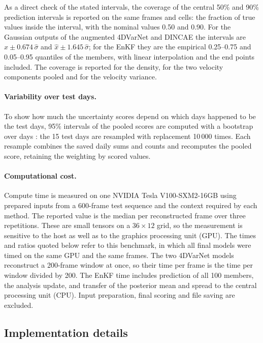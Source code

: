 \documentclass[english, 12pt, a4paper, elec, utf8, a-2b, online]{aaltothesis}
\begin{document}
As a direct check of the stated intervals, the coverage of the central 50\%
and 90\% prediction intervals is reported on the same frames and cells: the
fraction of true values inside the interval, with the nominal values 0.50 and
0.90. For the Gaussian outputs of the augmented 4DVarNet and DINCAE the
intervals are $\hat{x} \pm 0.674\,\hat{\sigma}$ and
$\hat{x} \pm 1.645\,\hat{\sigma}$; for the EnKF they are the empirical 0.25--0.75
and 0.05--0.95 quantiles of the members, with linear interpolation and the end
points included. The coverage is reported for the density, for the two
velocity components pooled and for the velocity variance.

\paragraph{Variability over test days.}
To show how much the uncertainty scores depend on which days happened to be the
test days, 95\% intervals of the pooled scores are computed with a bootstrap over days \cite{efron1979bootstrap}:
the 15 test days are resampled with replacement 10\,000 times.
Each resample combines the saved daily sums and counts and recomputes the
pooled score, retaining the weighting by scored values.

\paragraph{Computational cost.}
Compute time is measured on one NVIDIA Tesla V100-SXM2-16GB using prepared
inputs from a 600-frame test sequence and the context required by each method.
The reported value is the median per reconstructed frame over three repetitions.
These are small tensors on a $36 \times 12$ grid, so the measurement is
sensitive to the host as well as to the graphics processing unit (GPU). The times and ratios quoted below
refer to this benchmark, in which all final models were timed on the same GPU
and the same frames.
The two 4DVarNet models reconstruct a 200-frame window at once, so their time per
frame is the time per window divided by 200. The EnKF time includes prediction of all 100
members, the analysis update, and transfer of the posterior mean and spread
to the central processing unit (CPU). Input preparation, final scoring and file saving are excluded.

\subsection{Implementation details}
\label{sec:impl}
\end{document}
